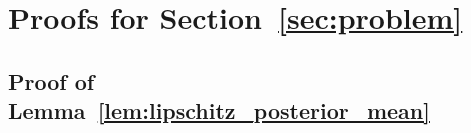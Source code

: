 \clearpage
\appendix
\onecolumn
\section{Proofs for Section~\ref{sec:problem}}
\label{sec:problem_proof}


\subsection{Proof of Lemma~\ref{lem:lipschitz_posterior_mean}}
\label{sec:proof_lipschitz_posterior_mean}



